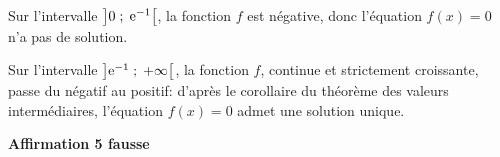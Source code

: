 \documentclass[10pt]{article}
\providecommand{\e}{{\mathrm{e}}}
\begin{document}
\begin{enumerate}
Sur l'intervalle $\left ]0\;;\;\e^{-1}\strut\right [$, la fonction $f$ est négative, donc l'équation $f(x)=0$ n'a pas de solution.

Sur l'intervalle $\left ]\e^{-1}\;;\; +\infty\strut\right [$, la fonction $f$, continue et strictement croissante, passe du négatif au positif: d'après le corollaire du théorème des valeurs intermédiaires, l'équation $f(x)=0$ admet une solution unique.

\hfill\textbf{Affirmation 5 fausse}
\end{enumerate}
\end{document}
